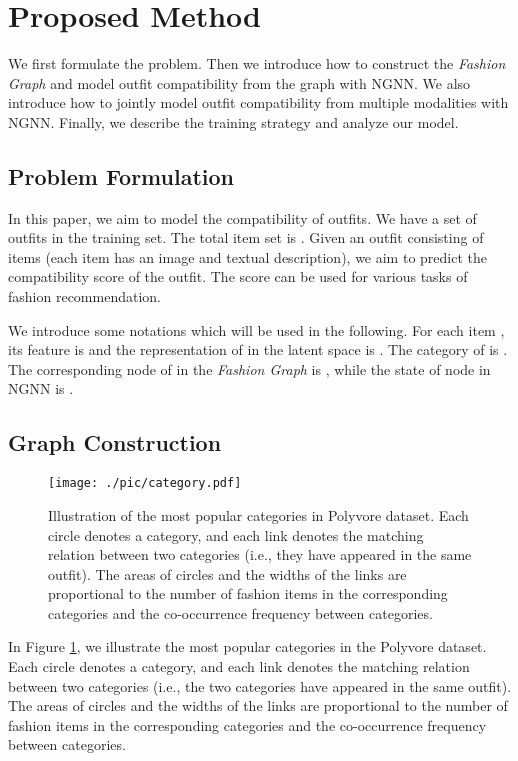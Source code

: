 \documentclass[sigconf]{acmart}
\begin{document}
\section{Proposed Method}
We first formulate the problem. Then we introduce how to construct the \emph{Fashion Graph} and model outfit compatibility from the graph with NGNN. We also introduce how to jointly model outfit compatibility from multiple modalities with NGNN. Finally, we describe the training strategy and analyze our model.


\subsection{Problem Formulation}
In this paper, we aim to model the compatibility of outfits.
We have a set of outfits  in the training set. The total item set is .
Given an outfit  consisting of  items (each item has an image and textual description), we aim to predict the compatibility score  of the outfit. The score can be used for various tasks of fashion recommendation.

We introduce some notations which will be used in the following.
For each item , its feature is  and the  representation of  in the latent space is . The category of  is . The corresponding node of  in the \emph{Fashion Graph} is , while the state of node  in NGNN is .



\subsection{Graph Construction} \label{sect:gi}
\begin{figure}[t]
\centering
\texttt{[image: ./pic/category.pdf]}
\caption{
Illustration of the most popular categories in Polyvore dataset. Each circle denotes a category, and each link denotes the matching relation between two categories (i.e., they have appeared in the same outfit).
The areas of circles and the widths of the links are proportional to the number of fashion items in the corresponding categories and the co-occurrence frequency between categories.
}
\label{fig:dataset_category}
\end{figure}

In Figure \ref{fig:dataset_category}, we illustrate the most popular categories in the Polyvore dataset. Each circle denotes a category, and each link denotes the matching relation between two categories (i.e., the two categories have appeared in the same outfit).
The areas of circles and the widths of the links are proportional to the number of fashion items in the corresponding categories and the co-occurrence frequency between categories.
\end{document}
